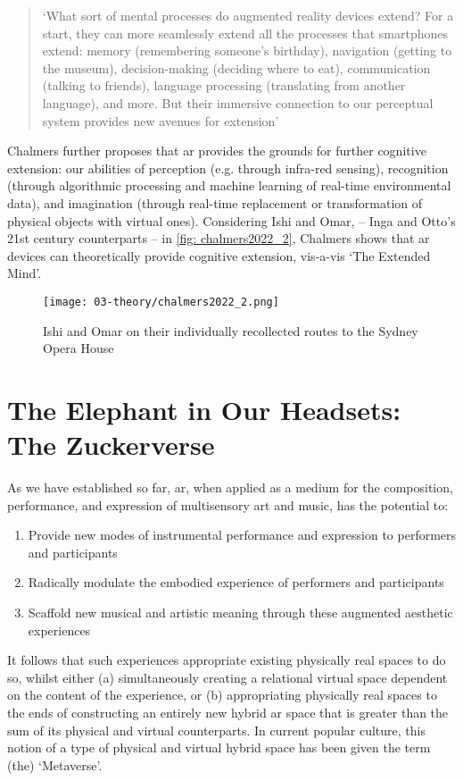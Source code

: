 \begin{quote}
    `What sort of mental processes do augmented reality devices extend? For a start, they can more seamlessly extend all the processes that smartphones extend: memory (remembering someone's birthday), navigation (getting to the museum), decision-making (deciding where to eat), communication (talking to friends), language processing (translating from another language), and more. But their immersive connection to our perceptual system provides new avenues for extension' \citep[p. 299]{chalmers2022}
\end{quote}
Chalmers further proposes that \gls{ar} provides the grounds for further cognitive extension: our abilities of perception (e.g. through infra-red sensing), recognition (through algorithmic processing and machine learning of real-time environmental data), and imagination (through real-time replacement or transformation of physical objects with virtual ones). Considering Ishi and Omar, -- Inga and Otto's 21st century counterparts -- in \autoref{fig: chalmers2022_2}, Chalmers shows that \gls{ar} devices can theoretically provide cognitive extension, vis-a-vis `The Extended Mind'.

\begin{figure}[ht]
    \centering
    \texttt{[image: 03-theory/chalmers2022\_2.png]}
    \captionsetup{justification=centering,margin=1.5cm}
    \caption{Ishi and Omar on their individually recollected routes to the Sydney Opera House \citep[by Tim Peacock, in][]{chalmers2022}}\label{fig: chalmers2022_2}
\end{figure}



\section{The Elephant in Our Headsets: The Zuckerverse}\label{sec: theory-space}
As we have established so far, \gls{ar}, when applied as a medium for the composition, performance, and expression of multisensory art and music, has the potential to:
\begin{enumerate}
    \item Provide new modes of instrumental performance and expression to performers and participants
    \item Radically modulate the embodied experience of performers and participants
    \item Scaffold new musical and artistic meaning through these augmented aesthetic experiences
\end{enumerate}
It follows that such experiences appropriate existing physically real spaces to do so, whilst either (a) simultaneously creating a relational virtual space dependent on the content of the experience, or (b) appropriating physically real spaces to the ends of constructing an entirely new hybrid \gls{ar} space that is greater than the sum of its physical and virtual counterparts. In current popular culture, this notion of a type of physical and virtual hybrid space has been given the term (the) `Metaverse'.

